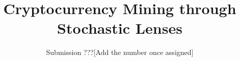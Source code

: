 \documentclass[format=acmsmall, review=false]{acmart}
\begin{document}
\title{Cryptocurrency Mining through Stochastic Lenses}
\author{Submission ???[Add the number once assigned]}



\maketitle

\newpage 










\newpage
\onecolumn
\appendix


\end{document}
